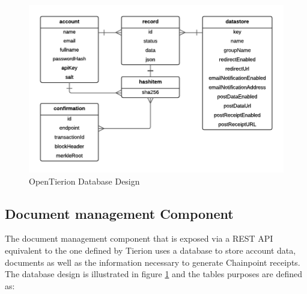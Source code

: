 \documentclass[12pt,msc,a4paper,oneside]{ucl_thesis}
\begin{document}
\begin{figure}
    \includegraphics[width=1.0\textwidth]{./figures/tierion_db.png}
    \caption{OpenTierion Database Design}
    \label{fig:tierion_database_design}
\end{figure}

\subsection{Document management Component}
The document management component that is exposed via a REST API equivalent to the one defined by Tierion uses a database to store account data, documents as well as the information necessary to generate Chainpoint receipts. The database design is illustrated in figure \ref{fig:tierion_database_design} and the tables purposes are defined as:
\end{document}
